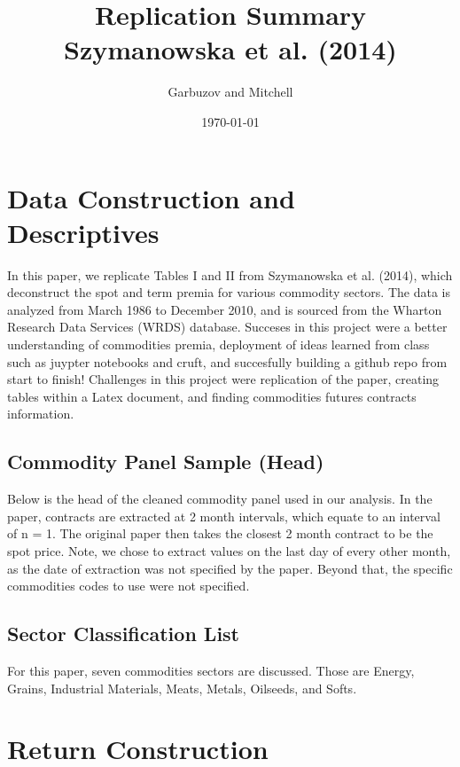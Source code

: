 \documentclass[11pt]{article}
\title{Replication Summary\\
\large Szymanowska et al. (2014)}
\author{Garbuzov and Mitchell}
\date{\today}
\begin{document}
\maketitle

\section{Data Construction and Descriptives}

In this paper, we replicate Tables I and II from Szymanowska et al. (2014), which deconstruct the spot and term premia for various commodity sectors.
The data is analyzed from March 1986 to December 2010, and is sourced from the Wharton Research Data Services (WRDS) database. 
Succeses in this project were a better understanding of commodities premia, deployment of ideas learned from class such as juypter notebooks and cruft, and succesfully building a github repo from start to finish!
Challenges in this project were replication of the paper, creating tables within a Latex document, and finding commodities futures contracts information.

\subsection{Commodity Panel Sample (Head)}

Below is the head of the cleaned commodity panel used in our analysis. 
In the paper, contracts are extracted at 2 month intervals, which equate to an interval of n = 1. The original paper then takes the closest 2 month contract to be the spot price. 
Note, we chose to extract values on the last day of every other month, as the date of extraction was not specified by the paper. Beyond that, the specific commodities codes to use were not specified.

\begin{center}
\resizebox{0.9\textwidth}{!}{%
}
\end{center}

\subsection{Sector Classification List}

For this paper, seven commodities sectors are discussed. Those are Energy, Grains, Industrial Materials, Meats, Metals, Oilseeds, and Softs.



\section{Return Construction}
\end{document}
